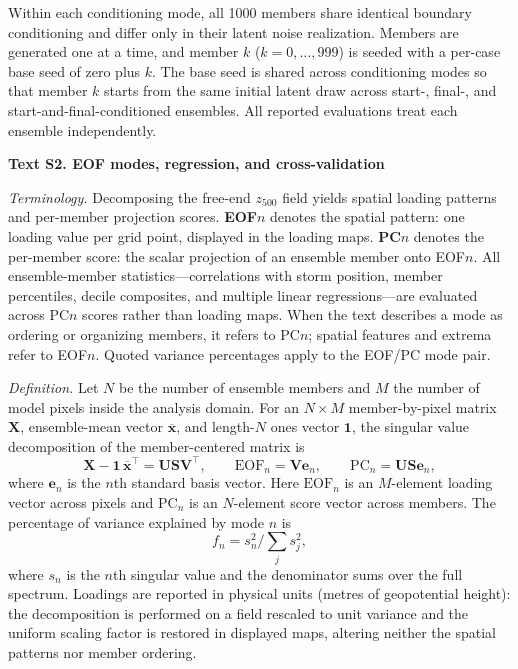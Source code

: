 Within each conditioning mode, all 1000 members share identical boundary conditioning and differ only in their latent noise realization. Members are generated one at a time, and member $k$ ($k = 0, \dots, 999$) is seeded with a per-case base seed of zero plus $k$. The base seed is shared across conditioning modes so that member $k$ starts from the same initial latent draw across start-, final-, and start-and-final-conditioned ensembles. All reported evaluations treat each ensemble independently.

\noindent\textbf{Text S2. EOF modes, regression, and cross-validation}

\noindent\textit{Terminology.} Decomposing the free-end $z_{500}$ field yields spatial loading patterns and per-member projection scores. \textbf{EOF$n$} denotes the spatial pattern: one loading value per grid point, displayed in the loading maps. \textbf{PC$n$} denotes the per-member score: the scalar projection of an ensemble member onto EOF$n$. All ensemble-member statistics---correlations with storm position, member percentiles, decile composites, and multiple linear regressions---are evaluated across PC$n$ scores rather than loading maps. When the text describes a mode as ordering or organizing members, it refers to PC$n$; spatial features and extrema refer to EOF$n$. Quoted variance percentages apply to the EOF/PC mode pair.

\noindent\textit{Definition.} Let $N$ be the number of ensemble members and $M$ the number of model pixels inside the analysis domain. For an $N \times M$ member-by-pixel matrix $\mathbf{X}$, ensemble-mean vector $\overline{\mathbf{x}}$, and length-$N$ ones vector $\mathbf{1}$, the singular value decomposition of the member-centered matrix is
\begin{equation}
\mathbf{X} - \mathbf{1}\,\overline{\mathbf{x}}^{\top} = \mathbf{U}\mathbf{S}\mathbf{V}^{\top},
\qquad
\mathrm{EOF}_{n} = \mathbf{V}\mathbf{e}_{n},
\qquad
\mathrm{PC}_{n} = \mathbf{U}\mathbf{S}\mathbf{e}_{n},
\end{equation}
where $\mathbf{e}_{n}$ is the $n$th standard basis vector. Here $\mathrm{EOF}_{n}$ is an $M$-element loading vector across pixels and $\mathrm{PC}_{n}$ is an $N$-element score vector across members. The percentage of variance explained by mode $n$ is
\begin{equation}
f_{n} = s_{n}^{2} \Big/ \sum_{j} s_{j}^{2},
\end{equation}
where $s_{n}$ is the $n$th singular value and the denominator sums over the full spectrum. Loadings are reported in physical units (metres of geopotential height): the decomposition is performed on a field rescaled to unit variance and the uniform scaling factor is restored in displayed maps, altering neither the spatial patterns nor member ordering.

